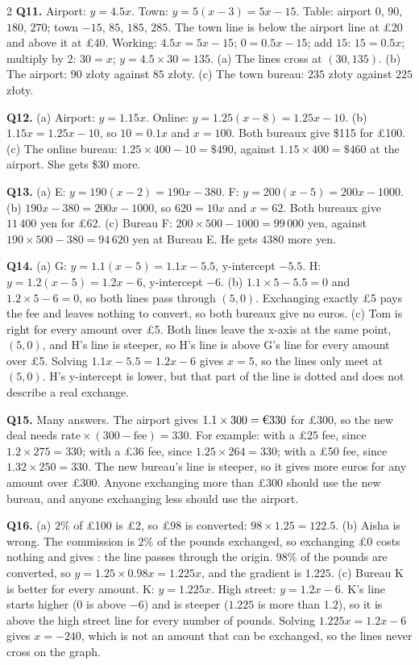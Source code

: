 \documentclass[12pt,a4paper]{article}
\newcommand{\zl}{z\l{}oty}
\begin{document}
{\begin{multicols}{2}
\textbf{Q11.} Airport: $y=4.5x$. Town: $y=5(x-3)=5x-15$. Table: airport $0$,
$90$, $180$, $270$; town $-15$, $85$, $185$, $285$. The town line is below the
airport line at \pounds20 and above it at \pounds40. Working:
$4.5x=5x-15$; $0=0.5x-15$; add $15$: $15=0.5x$; multiply by $2$: $30=x$;
$y=4.5\times30=135$. \quad
(a) The lines cross at $(30,135)$. \quad
(b) The airport: $90$ \zl{} against $85$ \zl{}. \quad
(c) The town bureau: $235$ \zl{} against $225$ \zl{}.

\textbf{Q12.} (a) Airport: $y=1.15x$. Online: $y=1.25(x-8)=1.25x-10$. \quad
(b) $1.15x=1.25x-10$, so $10=0.1x$ and $x=100$. Both bureaux give \$115 for
\pounds100. \quad
(c) The online bureau: $1.25\times400-10=\$490$, against
$1.15\times400=\$460$ at the airport. She gets \$30 more.

\textbf{Q13.} (a) E: $y=190(x-2)=190x-380$. F: $y=200(x-5)=200x-1000$. \quad
(b) $190x-380=200x-1000$, so $620=10x$ and $x=62$. Both bureaux give
$11\,400$ yen for \pounds62. \quad
(c) Bureau F: $200\times500-1000=99\,000$ yen, against
$190\times500-380=94\,620$ yen at Bureau E. He gets $4380$ more yen.

\textbf{Q14.} (a) G: $y=1.1(x-5)=1.1x-5.5$, y-intercept $-5.5$. H:
$y=1.2(x-5)=1.2x-6$, y-intercept $-6$. \quad
(b) $1.1\times5-5.5=0$ and $1.2\times5-6=0$, so both lines pass through
$(5,0)$. Exchanging exactly \pounds5 pays the fee and leaves nothing to
convert, so both bureaux give no euros. \quad
(c) Tom is right for every amount over \pounds5. Both lines leave the x-axis at
the same point, $(5,0)$, and H's line is steeper, so H's line is above G's line
for every amount over \pounds5. Solving $1.1x-5.5=1.2x-6$ gives $x=5$, so the
lines only meet at $(5,0)$. H's y-intercept is lower, but that part of the line
is dotted and does not describe a real exchange.

\textbf{Q15.} Many answers. The airport gives $1.1\times300=\text{\texteuro}330$
for \pounds300, so the new deal needs
$\text{rate}\times(300-\text{fee})=330$. For example:  with a
\pounds25 fee, since $1.2\times275=330$;  with a \pounds36 fee,
since $1.25\times264=330$;  with a \pounds50 fee, since
$1.32\times250=330$. The new bureau's line is steeper, so it gives more euros
for any amount over \pounds300. Anyone exchanging more than \pounds300 should
use the new bureau, and anyone exchanging less should use the airport.

\textbf{Q16.} (a) $2\%$ of \pounds100 is \pounds2, so \pounds98 is converted:
$98\times1.25=122.5$. \quad
(b) Aisha is wrong. The commission is $2\%$ of the pounds exchanged, so
exchanging \pounds0 costs nothing and gives : the line passes through
the origin. $98\%$ of the pounds are converted, so $y=1.25\times0.98x=1.225x$,
and the gradient is $1.225$. \quad
(c) Bureau K is better for every amount. K: $y=1.225x$. High street:
$y=1.2x-6$. K's line starts higher ($0$ is above $-6$) and is steeper ($1.225$
is more than $1.2$), so it is above the high street line for every number of
pounds. Solving $1.225x=1.2x-6$ gives $x=-240$, which is not an amount that can
be exchanged, so the lines never cross on the graph.

\end{multicols}
}
\end{document}
